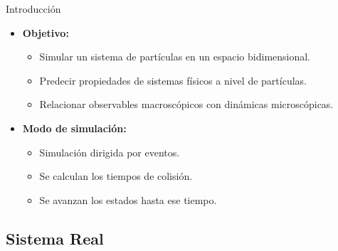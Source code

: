 \documentclass{beamer}
\begin{document}
        \begin{frame}{Introducción}
            \begin{itemize}
                \item \textbf{Objetivo:}
                \begin{itemize}
                    \item Simular un sistema de partículas en un espacio bidimensional.
                    \item Predecir propiedades de sistemas físicos a nivel de partículas.
                    \item Relacionar observables macroscópicos con dinámicas microscópicas.
                \end{itemize}
                \item \textbf{Modo de simulación:}
                \begin{itemize}
                    \item Simulación dirigida por eventos.
                    \item Se calculan los tiempos de colisión.
                    \item Se avanzan los estados hasta ese tiempo.
                \end{itemize}
            \end{itemize}
        \end{frame}

        \subsection{Sistema Real}
\end{document}
